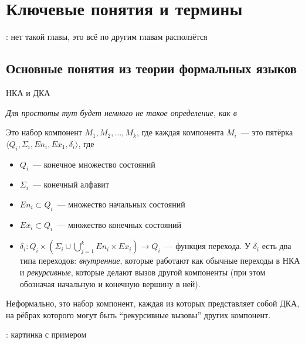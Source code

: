 \section{Ключевые понятия и термины}

\TODO: нет такой главы, это всё по другим главам расползётся

\subsection{Основные понятия из теории формальных языков}



\begin{definition}
    НКА и ДКА
    
\end{definition}

\begin{definition}
    \textit{Для простоты тут будет немного не такое определение, как в~\cite{Alur05}}

    Это набор компонент $M_1, M_2, \dots , M_k$, где каждая компонента $M_i$~--- это пятёрка $\langle Q_i, \Sigma_i, En_i, Ex_1, \delta_i \rangle$, где 
        \begin{itemize}
          \setlength\itemsep{-0.1em}
          \item $Q_i$~--- конечное множество состояний
          \item $\Sigma_i$~--- конечный алфавит
          \item $En_i \subset Q_i$~--- множество начальных состояний
          \item $Ex_i \subset Q_i$~--- множество конечных состояний
          \item $\delta_i \colon Q_i \times (\Sigma_i \cup \bigcup\limits_{j = 1}^k En_i \times Ex_i ) \to Q_i$~--- функция перехода. У $\delta_i$ есть два типа переходов: \textit{внутренние}, которые работают как обычные переходы в НКА и \textit{рекурсивные}, которые делают вызов другой компоненты (при этом обозначая начальную и конечную вершину в ней).
        \end{itemize}

    Неформально, это набор компонент, каждая из которых представляет собой ДКА, на рёбрах которого могут быть ``рекурсивные вызовы'' других компонент.

    \TODO: картинка с примером
    
\end{definition}

